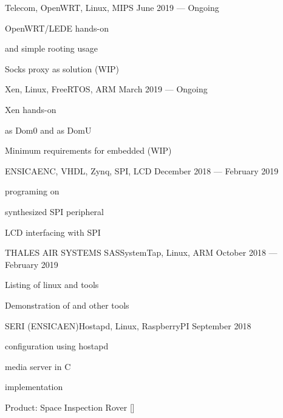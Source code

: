 
        {}{Telecom, OpenWRT, Linux, MIPS}
        {June 2019 --- Ongoing}
        {
            \begin{additems}
                \item OpenWRT/LEDE  hands-on
                \item {} and simple rooting usage
                \item Socks proxy as  solution (WIP)
            \end{additems}
        }

        {}{Xen, Linux, FreeRTOS, ARM}
        {March 2019 --- Ongoing}
        {
            \begin{additems}
                \item Xen  hands-on
                \item {} as Dom0 and  as DomU
                \item Minimum requirements for embedded (WIP)
            \end{additems}
        }

        {ENSICAEN}{C, VHDL, Zynq, SPI, LCD}
        {December 2018 --- February 2019}
        {
            \begin{additems}
                \item {} programing on 
                \item {} synthesized SPI peripheral
                \item LCD interfacing with SPI
            \end{additems}
        }

        {THALES AIR SYSTEMS SAS}{SystemTap, Linux, ARM}
        {October 2018 --- February 2019}
        {
            \begin{additems}
                \item Listing of linux  and  tools
                \item Demonstration of  and other tools
            \end{additems}
        }

        {SERI (ENSICAEN)}{Hostapd, Linux, RaspberryPI}
        {September 2018}
        {
            \begin{additems}
                \item {} configuration using hostapd
                \item {} media server in C
                \item {} implementation
                \item Product: Space Inspection Rover []
            \end{additems}
        }
